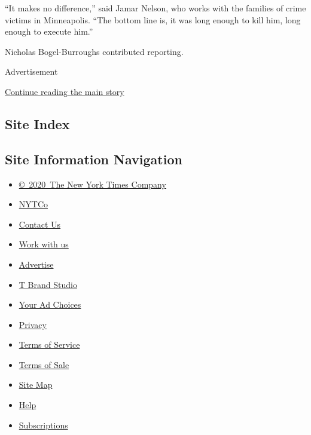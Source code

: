 ``It makes no difference,'' said Jamar Nelson, who works with the
families of crime victims in Minneapolis. ``The bottom line is, it was
long enough to kill him, long enough to execute him.''

Nicholas Bogel-Burroughs contributed reporting.

Advertisement

\protect\hyperlink{after-bottom}{Continue reading the main story}

\hypertarget{site-index}{%
\subsection{Site Index}\label{site-index}}

\hypertarget{site-information-navigation}{%
\subsection{Site Information
Navigation}\label{site-information-navigation}}

\begin{itemize}
\tightlist
\item
  \href{https://help.nytimes.com/hc/en-us/articles/115014792127-Copyright-notice}{©~2020~The
  New York Times Company}
\end{itemize}

\begin{itemize}
\tightlist
\item
  \href{https://www.nytco.com/}{NYTCo}
\item
  \href{https://help.nytimes.com/hc/en-us/articles/115015385887-Contact-Us}{Contact
  Us}
\item
  \href{https://www.nytco.com/careers/}{Work with us}
\item
  \href{https://nytmediakit.com/}{Advertise}
\item
  \href{http://www.tbrandstudio.com/}{T Brand Studio}
\item
  \href{https://www.nytimes.com/privacy/cookie-policy\#how-do-i-manage-trackers}{Your
  Ad Choices}
\item
  \href{https://www.nytimes.com/privacy}{Privacy}
\item
  \href{https://help.nytimes.com/hc/en-us/articles/115014893428-Terms-of-service}{Terms
  of Service}
\item
  \href{https://help.nytimes.com/hc/en-us/articles/115014893968-Terms-of-sale}{Terms
  of Sale}
\item
  \href{https://spiderbites.nytimes.com}{Site Map}
\item
  \href{https://help.nytimes.com/hc/en-us}{Help}
\item
  \href{https://www.nytimes.com/subscription?campaignId=37WXW}{Subscriptions}
\end{itemize}
